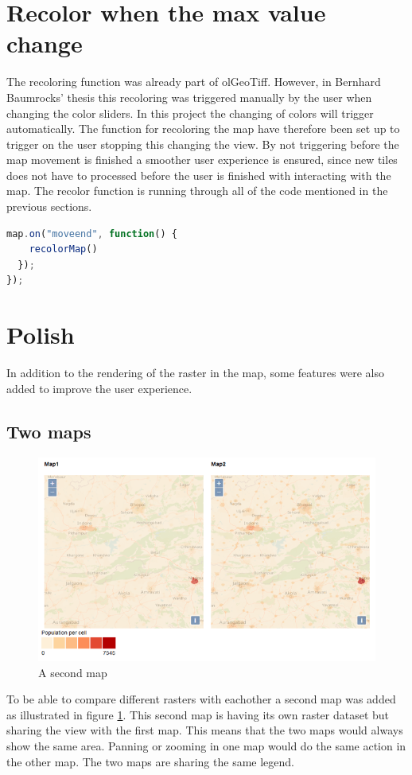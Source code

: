 \section{Recolor when the max value change}

The recoloring function was already part of olGeoTiff. However, in Bernhard Baumrocks’ thesis this recoloring was triggered manually by the user when changing the color sliders. In this project the changing of colors will trigger automatically. The function for recoloring the map have therefore been set up to trigger on the user stopping this changing the view. By not triggering before the map movement is finished a smoother user experience is ensured, since new tiles does not have to processed before the user is finished with interacting with the map. The recolor function is running through all of the code mentioned in the previous sections. 

\begin{lstlisting}[language=JavaScript, caption={The JavaScript in the project}, label= VoresJS,escapechar=|]
  map.on("moveend", function() {
    recolorMap()
  });
});
\end{lstlisting}
\section{Polish}
In addition to the rendering of the raster in the map, some features were also added to improve the user experience.


\subsection{Two maps}

\begin{figure} [H]
	\centering
	\includegraphics[width=.8\textwidth]{Pictures/DualMaps}
	\caption{A second map}
	\label{DualMaps}
\end{figure}
To be able to compare different rasters with eachother a second map was added as illustrated in figure \ref{DualMaps}. This second map is having its own raster dataset but sharing the view with the first map. This means that the two maps would always show the same area. Panning or zooming in one map would do the same action in the other map. The two maps are sharing the same legend. 
 

